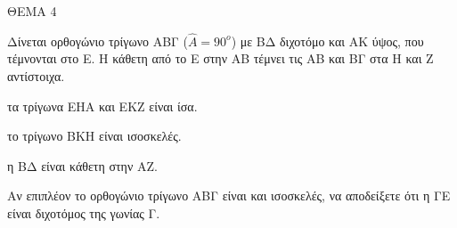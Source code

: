 
ΘΕΜΑ 4

Δίνεται ορθογώνιο τρίγωνο ΑΒΓ ($\widehat{A} = 90^{o}$) με ΒΔ διχοτόμο και ΑΚ ύψος, που τέμνονται στο Ε. Η κάθετη από το Ε στην ΑΒ τέμνει τις ΑΒ και ΒΓ στα Η και Ζ αντίστοιχα.

\begin{alist}
\item Να αποδείξετε ότι:

.}
\end{alist}
\begin{alist}
\item
  τα τρίγωνα ΕΗΑ και ΕΚΖ είναι ίσα. 
\item
  το τρίγωνο ΒΚΗ είναι ισοσκελές. 
\item
  η ΒΔ είναι κάθετη στην ΑΖ. 

\item Αν επιπλέον το ορθογώνιο τρίγωνο ΑΒΓ είναι και ισοσκελές, να αποδείξετε ότι η ΓΕ είναι διχοτόμος της γωνίας Γ. 


\end{alist}
